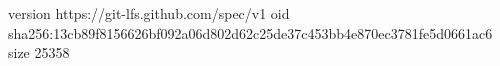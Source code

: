 version https://git-lfs.github.com/spec/v1
oid sha256:13cb89f8156626bf092a06d802d62c25de37c453bb4e870ec3781fe5d0661ac6
size 25358
